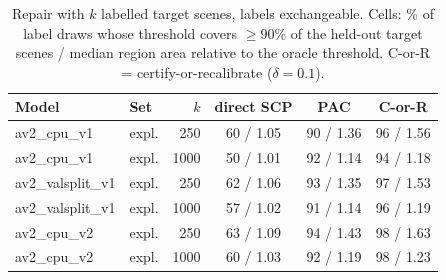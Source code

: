 \begin{table}[t]
\centering
\caption{Repair with $k$ labelled target scenes, labels exchangeable. Cells: \% of label draws whose threshold covers $\ge 90\%$ of the held-out target scenes / median region area relative to the oracle threshold. C-or-R = certify-or-recalibrate ($\delta=0.1$).}
\label{tab:repair}
\begin{tabular}{llrccc}
\toprule
Model & Set & $k$ & direct SCP & PAC & C-or-R \\
\midrule
av2\_cpu\_v1 & expl. & 250 & 60 / 1.05 & 90 / 1.36 & 96 / 1.56 \\
av2\_cpu\_v1 & expl. & 1000 & 50 / 1.01 & 92 / 1.14 & 94 / 1.18 \\
av2\_valsplit\_v1 & expl. & 250 & 62 / 1.06 & 93 / 1.35 & 97 / 1.53 \\
av2\_valsplit\_v1 & expl. & 1000 & 57 / 1.02 & 91 / 1.14 & 96 / 1.19 \\
av2\_cpu\_v2 & expl. & 250 & 63 / 1.09 & 94 / 1.43 & 98 / 1.63 \\
av2\_cpu\_v2 & expl. & 1000 & 60 / 1.03 & 92 / 1.19 & 98 / 1.23 \\
\bottomrule
\end{tabular}
\end{table}
